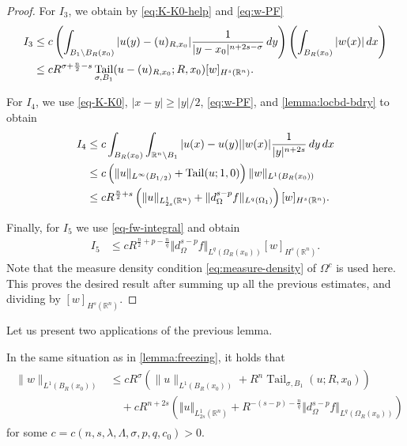 \documentclass[11pt,reqno]{amsart}
\theoremstyle{plain}
\theoremstyle{definition}
\numberwithin{equation}{section}
\newcommand{\R}{\mathbb{R}}
\newcommand{\1}{\mathbbm{1}}
\DeclareMathOperator{\tail}{Tail}
\renewcommand{\d}{\textnormal{\,d}}
\begin{document}
\begin{proof}
For $I_3$, we obtain by \eqref{eq:K-K0-help} and \eqref{eq:w-PF}
\begin{align*}
I_3
&\le c \left(\int_{B_1 \setminus B_{R}(x_0)} |u(y) - (u)_{R,x_0}| \frac{1}{|y-x_0|^{n+2s-\sigma}} \d y \right) \left(\int_{B_R(x_0)} |w(x)| \d x \right)\\
&\le cR^{\sigma + \frac{n}{2}-s} \tail_{\sigma,B_1}(u-(u)_{R,x_0};R,x_0) [w]_{H^s(\R^n)}.
\end{align*}

For $I_4$, we use \eqref{eq-K-K0}, $|x-y| \geq |y|/2$, \eqref{eq:w-PF}, and \autoref{lemma:locbd-bdry} to obtain
\begin{align*}
    I_4 &\le c \int_{B_{R}(x_0)}\int_{\R^n \setminus B_1} |u(x) - u(y)||w(x)| \frac{1}{|y|^{n+2s}} \d y \d x \\
    &\le c \left( \|u\|_{L^\infty(B_{1/2})} + \tail(u; 1, 0) \right) \|w\|_{L^1(B_R(x_0))} \\
    &\le c R^{\frac{n}{2} + s} \left( \Vert u \Vert_{L^1_{2s}(\R^n)} + \Vert d^{s-p}_{\Omega} f \Vert_{L^q(\Omega_1)} \right) [w]_{H^s(\R^n)}.
\end{align*}

Finally, for $I_5$ we use \eqref{eq-fw-integral} and obtain
\begin{align*}
    I_5 &\le c R^{\frac{n}{2} + p - \frac{n}{q}} \Vert d_{\Omega}^{s-p} f \Vert_{L^q(\Omega_R(x_0))} [w]_{H^s(\R^n)}.
\end{align*}
Note that the measure density condition \eqref{eq:measure-density} of $\Omega^c$ is used here.
This proves the desired result after summing up all the previous estimates, and dividing by $[w]_{H^s(\R^n)}$.
\end{proof}

Let us present two applications of the previous lemma.

\begin{lemma}
\label{lemma:freezing-l2}
In the same situation as in \autoref{lemma:freezing}, it holds that
\begin{align*}
\begin{split}
\|w\|_{L^1(B_R(x_0))}
&\le c R^{\sigma} \left( \|u\|_{L^1(B_R(x_0))} + R^n \tail_{\sigma,B_1}(u; R,x_0) \right) \\
&\quad + cR^{n + 2s} \left( \Vert u \Vert_{L^1_{2s}(\R^n)} + R^{-(s-p) - \frac{n}{q}} \Vert d^{s-p}_{\Omega} f \Vert_{L^q(\Omega_R(x_0))} \right)
\end{split}
\end{align*}
for some $c=c(n, s, \lambda, \Lambda, \sigma, p, q, c_0)>0$.
\end{lemma}
\end{document}
